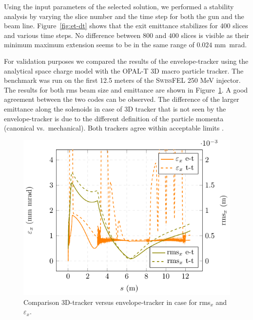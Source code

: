 Using the input parameters of the selected solution, we performed a stability
  analysis by varying the slice number and the time step for both the gun and
  the beam line.
Figure~\ref{fig:et-dt} shows that the exit emittance stabilizes for 400
  slices and various time steps.
No difference between $800$ and $400$ slices is visible as their minimum
  maximum extension seems to be in the same range of $0.024$ mm~mrad.

For validation purposes we compared the results of the envelope-tracker using
  the analytical space charge model with the \textsc{OPAL-T} 3D macro particle
  tracker.
The benchmark was run on the first 12.5 meters of the \textsc{SwissFEL} 250
  MeV injector.
The results for both rms beam size and emittance are shown in
  Figure~\ref{fig:et-vs-tt}.
A good agreement between the two codes can be observed.
The difference of the larger emittance along the solenoids in case of 3D
  tracker that is not seen by the envelope-tracker is due to the different
  definition of the particle momenta (canonical vs.~mechanical).
Both trackers agree within acceptable limits \cite{chao:99}.

\begin{figure}
  \centering
  \includegraphics[width=0.9\linewidth]{Report/iff_plot_emrms_ettt}
  \caption{Comparison 3D-tracker versus envelope-tracker in case for rms$_{x}$
    and $\varepsilon_{x}$.}
  \label{fig:et-vs-tt}
\end{figure}


